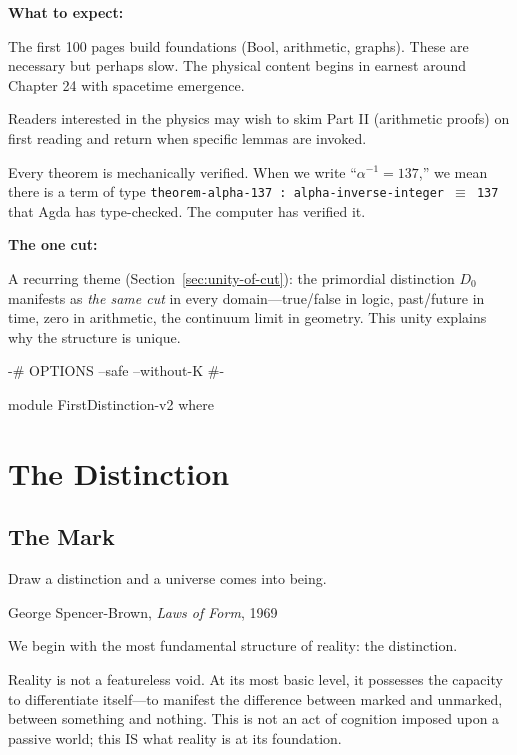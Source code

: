 \documentclass[11pt,a4paper]{book}
\begin{document}
\medskip

\noindent\textbf{What to expect:}

The first 100 pages build foundations (Bool, arithmetic, graphs). These are 
necessary but perhaps slow. The physical content begins in earnest around 
Chapter 24 with spacetime emergence.

Readers interested in the physics may wish to skim Part II (arithmetic proofs) 
on first reading and return when specific lemmas are invoked.

Every theorem is mechanically verified. When we write ``$\alpha^{-1} = 137$,'' 
we mean there is a term of type \texttt{theorem-alpha-137 : alpha-inverse-integer $\equiv$ 137} 
that Agda has type-checked. The computer has verified it.

\medskip

\noindent\textbf{The one cut:}

A recurring theme (Section~\ref{sec:unity-of-cut}): the primordial distinction $D_0$ 
manifests as \emph{the same cut} in every domain---true/false in logic, past/future 
in time, zero in arithmetic, the continuum limit in geometry. This unity explains 
why the structure is unique.

\begin{code}
{-# OPTIONS --safe --without-K #-}

module FirstDistinction-v2 where
\end{code}

\tableofcontents
\mainmatter

\part{The Distinction}


\chapter{The Mark}

\epigraph{Draw a distinction and a universe comes into being.}{George Spencer-Brown, \textit{Laws of Form}, 1969}

We begin with the most fundamental structure of reality: the distinction.

Reality is not a featureless void. At its most basic level, it possesses the capacity to differentiate itself—to manifest the difference between marked and unmarked, between something and nothing. This is not an act of cognition imposed upon a passive world; this IS what reality is at its foundation.
\end{document}
